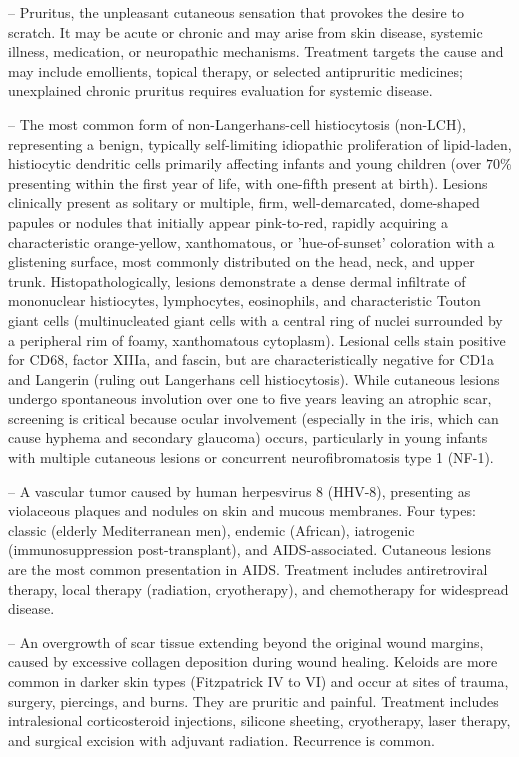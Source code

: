 -- Pruritus, the unpleasant cutaneous sensation that provokes the desire to scratch. It may be acute or chronic and may arise from skin disease, systemic illness, medication, or neuropathic mechanisms. Treatment targets the cause and may include emollients, topical therapy, or selected antipruritic medicines; unexplained chronic pruritus requires evaluation for systemic disease.

-- The most common form of non-Langerhans-cell histiocytosis (non-LCH), representing a benign, typically self-limiting idiopathic proliferation of lipid-laden, histiocytic dendritic cells primarily affecting infants and young children (over $70\%$ presenting within the first year of life, with one-fifth present at birth). Lesions clinically present as solitary or multiple, firm, well-demarcated, dome-shaped papules or nodules that initially appear pink-to-red, rapidly acquiring a characteristic orange-yellow, xanthomatous, or 'hue-of-sunset' coloration with a glistening surface, most commonly distributed on the head, neck, and upper trunk. Histopathologically, lesions demonstrate a dense dermal infiltrate of mononuclear histiocytes, lymphocytes, eosinophils, and characteristic Touton giant cells (multinucleated giant cells with a central ring of nuclei surrounded by a peripheral rim of foamy, xanthomatous cytoplasm). Lesional cells stain positive for CD68, factor XIIIa, and fascin, but are characteristically negative for CD1a and Langerin (ruling out Langerhans cell histiocytosis). While cutaneous lesions undergo spontaneous involution over one to five years leaving an atrophic scar, screening is critical because ocular involvement (especially in the iris, which can cause hyphema and secondary glaucoma) occurs, particularly in young infants with multiple cutaneous lesions or concurrent neurofibromatosis type 1 (NF-1).

-- A vascular tumor caused by human herpesvirus 8 (HHV-8), presenting as violaceous plaques and nodules on skin and mucous membranes. Four types: classic (elderly Mediterranean men), endemic (African), iatrogenic (immunosuppression post-transplant), and AIDS-associated. Cutaneous lesions are the most common presentation in AIDS. Treatment includes antiretroviral therapy, local therapy (radiation, cryotherapy), and chemotherapy for widespread disease.

-- An overgrowth of scar tissue extending beyond the original wound margins, caused by excessive collagen deposition during wound healing. Keloids are more common in darker skin types (Fitzpatrick IV to VI) and occur at sites of trauma, surgery, piercings, and burns. They are pruritic and painful. Treatment includes intralesional corticosteroid injections, silicone sheeting, cryotherapy, laser therapy, and surgical excision with adjuvant radiation. Recurrence is common.

